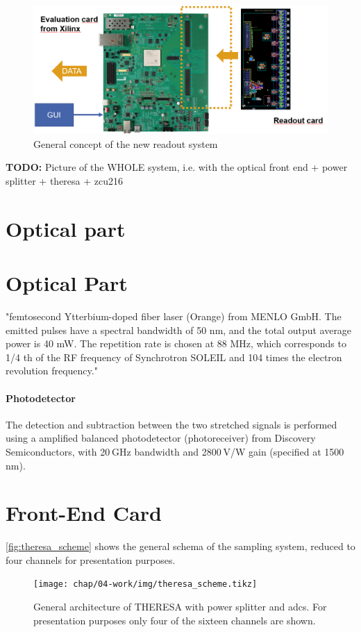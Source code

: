 \begin{figure}[tbh]
	\centering
	\includegraphics[width = \textwidth]{chap/04-work/img/concept_theresa}
	\caption{General concept of the new readout system}
	\label{fig:concept_theresa}
\end{figure}
\textbf{TODO:} Picture of the WHOLE system, i.e. with the optical front end + power splitter + theresa + zcu216
\section{Optical part}

\section{Optical Part}
"femtosecond Ytterbium-doped fiber laser (Orange) from MENLO GmbH. The emitted pulses have a spectral bandwidth of 50 nm, and the total
output average power is 40 mW. The repetition rate is chosen at 88 MHz, which corresponds to 1/4 th of
the RF frequency of Synchrotron SOLEIL and 104 times the electron revolution frequency."

\paragraph{Photodetector}
The detection and subtraction between the two stretched signals is performed using a amplified balanced photodetector (photoreceiver) from Discovery Semiconductors, with 20 GHz bandwidth and 2800 V/W gain (specified at 1500 nm).

\section{Front-End Card}
\autoref{fig:theresa_scheme} shows the general schema of the sampling system, reduced to four channels for presentation purposes.
\begin{figure}[H]
	\centering
	\texttt{[image: chap/04-work/img/theresa\_scheme.tikz]}
	\caption[General architecture of THERESA]{General architecture of THERESA with power splitter and \glspl{adc}. For presentation purposes only four of the sixteen channels are shown.}
	\label{fig:theresa_scheme}
\end{figure}

